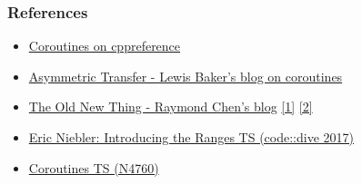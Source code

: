 \documentclass[aspectratio=169]{beamer}
\begin{document}
\begin{frame}
\frametitle{References}
\begin{itemize}
\item \href{https://en.cppreference.com/w/cpp/language/coroutines}{Coroutines on cppreference}
\item \href{https://lewissbaker.github.io/}{Asymmetric Transfer - Lewis Baker's blog on coroutines}
\item \href{https://devblogs.microsoft.com/oldnewthing/}{The Old New Thing - Raymond Chen's blog} \href{https://devblogs.microsoft.com/oldnewthing/20191209-00/?p=103195}{[1]} \href{https://devblogs.microsoft.com/oldnewthing/20210301-00/?p=104914}{[2]}
\item \href{https://www.youtube.com/watch?v=LNXkPh3Z418}{Eric Niebler: Introducing the Ranges TS (code::dive 2017)}
\item \href{http://www.open-std.org/jtc1/sc22/wg21/docs/papers/2018/n4760.pdf}{Coroutines TS (N4760)}

\end{itemize}


\end{frame}
\end{document}
